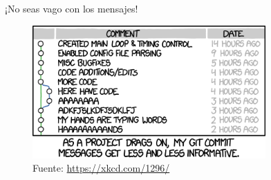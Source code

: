 \begin{frame}[t]{¡No seas vago con los mensajes!}

    \begin{figure}[ht]
        \begin{center}
            \includegraphics[height=2in]{images/xkcd-git-commit.png}
        \end{center}
        \caption{Fuente: \url{https://xkcd.com/1296/}}
    \end{figure}

\end{frame}
